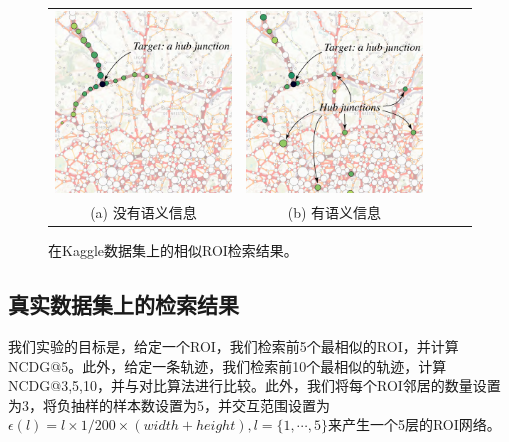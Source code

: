 \tabcolsep=2pt
\begin{figure}[!t]
\centering
\begin{tabular}{ccccc}
\includegraphics[width=65mm]{pics/SP3.pdf}&
\includegraphics[width=65mm]{pics/SP4.pdf}\\
(a) 没有语义信息 & (b) 有语义信息
\end{tabular}
\caption{在Kaggle数据集上的相似ROI检索结果。}
\label{fig:regionSim}
\end{figure}


\subsection{真实数据集上的检索结果}

我们实验的目标是，给定一个ROI，我们检索前5个最相似的ROI，并计算 NCDG@5。此外，给定一条轨迹，我们检索前10个最相似的轨迹，计算NCDG@3,5,10，并与对比算法进行比较。此外，我们将每个ROI邻居的数量设置为3，将负抽样的样本数设置为5，并交互范围设置为$\epsilon(l) = l \times 1/200\times(width + height), l = \{1,\cdots,5\}$来产生一个5层的ROI网络。

